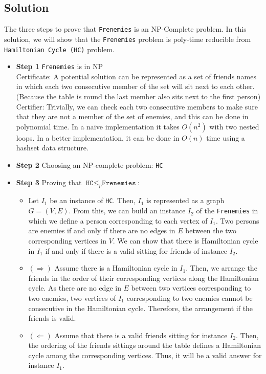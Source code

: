 \documentclass{article}
\begin{document}
\subsection*{Solution}
The three steps to prove that \texttt{Frenemies} is an NP-Complete problem. In this solution, we will show that the \texttt{Frenemies} problem is poly-time reducible from \texttt{Hamiltonian Cycle (HC)} problem.
\begin{itemize}
	\item \textbf{Step 1} \texttt{Frenemies} is in NP\\
	Certificate: A  potential solution can be represented as a set of friends names in which each two consecutive member of the set will sit next to each other. (Because the table is round the last member also sits next to the first person) \\
	Certifier: Trivially, we can check each two consecutive members to make sure that they are not a member of the set of enemies, and this can be done in polynomial time. In a naive implementation it takes $O(n^2)$ with two nested loops. In a better implementation, it can be done in $O(n)$ time using a hashset data structure.
	
	\item \textbf{Step 2} Choosing an NP-complete problem: \texttt{HC}
	
	\item \textbf{Step 3} Proving that $\texttt{HC} \leq_p \texttt{Frenemies}$:\\
	\begin{itemize}
		\item Let $I_1$ be an instance of \texttt{HC}. Then, $I_1$ is represented as a graph $G=(V,E)$. From this, we can build an instance $I_2$ of the \texttt{Frenemies} in which we define a person corresponding to each vertex of $I_1$. Two persons are enemies if and only if there are no edges in $E$ between the two corresponding vertices in $V$. We can show that there is Hamiltonian cycle in $I_1$ if and only if there is a valid sitting for friends of instance $I_2$.
		
		\item $(\Rightarrow)$ Assume there is a Hamiltonian cycle in $I_1$. Then, we arrange the friends in the order of their corresponding vertices along the Hamiltonian cycle. As there are no edge in $E$ between two vertices corresponding to two enemies, two vertices of $I_1$ corresponding to two enemies cannot be consecutive in the Hamiltonian cycle. Therefore, the arrangement if the friends is valid.
		
		\item$(\Leftarrow)$ Assume that there is a valid friends sitting for instance $I_2$. Then, the ordering of the friends sittings around the table defines a Hamiltonian cycle among the corresponding vertices. Thus, it will be a valid answer for instance $I_1$.
		
	\end{itemize}		
\end{itemize}
\newpage
\color{black}
\end{document}
